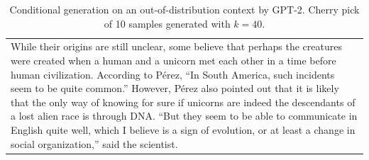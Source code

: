 \documentclass{article}
\begin{document}
{\begin{table}[t]
\begin{center}
\begin{tabular}{|p{14cm}|}
\newline\newline
While their origins are still unclear, some believe that perhaps the creatures were created when a human and a unicorn met each other in a time before human civilization. According to P\'erez, ``In South America, such incidents seem to be quite common.''
\newline\newline
However, P\'erez also pointed out that it is likely that the only way of knowing for sure if unicorns are indeed the descendants of a lost alien race is through DNA. ``But they seem to be able to communicate in English quite well, which I believe is a sign of evolution, or at least a change in social organization,'' said the scientist.
\cline{1-14}
\end{tabular}
\caption{Conditional generation on an out-of-distribution context by GPT-2. Cherry pick of 10 samples generated with $k=40$.}
\label{talkingunicorns}
\end{center}
\end{table}
}
\end{document}
